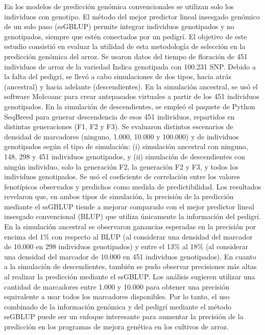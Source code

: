 \documentclass[11pt,spanish,a4paper,oneside,]{book} %
\begin{document}
\noindent 
En los modelos de predicción genómica convencionales se utilizan solo los individuos con genotipo. El método del mejor predictor lineal insesgado genómico de un solo paso (ssGBLUP) permite integrar individuos genotipados y no genotipados, siempre que estén conectados por un pedigrí. El objetivo de este estudio consistió en evaluar la utilidad de esta metodología de selección en la predicción genómica del arroz. Se usaron datos del tiempo de floración de 451 individuos de arroz de la variedad Indica genotipada con 100.231 SNP. Debido a la falta del pedigrí, se llevó a cabo simulaciones de dos tipos, hacia atrás (ancestral) y hacia adelante (descendientes). En la simulación ancestral, se usó el software Molcoanc para crear antepasados virtuales a partir de los 451 individuos genotipados. En la simulación de descendientes, se empleó el paquete de Python SeqBreed para generar descendencia de esos 451 individuos, repartidos en distintas generaciones (F1, F2 y F3). Se evaluaron distintos escenarios de densidad de marcadores (ninguno, 1.000, 10.000 y 100.000) y de individuos genotipados según el tipo de simulación: (i) simulación ancestral con ninguno, 148, 298 y 451 individuos genotipados, y (ii) simulación de descendientes con ningún individuo, solo la generación F2, la generación F2 y F3, y todos los individuos genotipados. Se usó el coeficiente de correlación entre los valores fenotípicos observados y predichos como medida de predictibilidad. Los resultados revelaron que, en ambos tipos de simulación, la precisión de la predicción mediante el ssGBLUP tiende a mejorar comparado con el mejor predictor lineal insesgado convencional (BLUP) que utiliza únicamente la información del pedigrí. En la simulación ancestral se observaron ganancias esperadas en la precisión por encima del 1\% con respecto al BLUP (al considerar una densidad del marcador de 10.000 en 298 individuos genotipados) y entre el 13\% al 18\% (al considerar una densidad del marcador de 10.000 en 451 individuos genotipados). En cuanto a la simulación de descendientes, también se pudo observar precisiones más altas al realizar la predicción mediante el ssGBLUP. Los análisis sugieren utilizar una cantidad de marcadores entre 1.000 y 10.000 para obtener una precisión equivalente a usar todos los marcadores disponibles. Por lo tanto, el uso combinado de la información genómica y del pedigrí mediante el método ssGBLUP puede ser un enfoque interesante para aumentar la precisión de la predicción en los programas de mejora genética en los cultivos de arroz.
\end{document}
